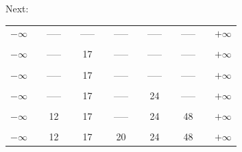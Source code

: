 \documentclass[english]{article}
\begin{document}
    Next:\\
\begin{tabular}{ccccccccccccc}
    $-\infty$ &  & ----- &  & ----- &  & ----- &  & ----- &  & ----- &  & $+\infty$\tabularnewline
              &  &       &  &       &  &       &  &       &  &       &  & \tabularnewline
    $-\infty$ &  & ----- &  & 17    &  & ----- &  & ----- &  & ----- &  & $+\infty$\tabularnewline
              &  &       &  &       &  &       &  &       &  &       &  & \tabularnewline
    $-\infty$ &  & ----- &  & 17    &  & ----- &  & ----- &  & ----- &  & $+\infty$\tabularnewline
              &  &       &  &       &  &       &  &       &  &       &  & \tabularnewline
    $-\infty$ &  & ----- &  & 17    &  & ----- &  & 24    &  & ----- &  & $+\infty$\tabularnewline
              &  &       &  &       &  &       &  &       &  &       &  & \tabularnewline
    $-\infty$ &  & 12    &  & 17    &  & ----- &  & 24    &  & 48    &  & $+\infty$\tabularnewline
              &  &       &  &       &  &       &  &       &  &       &  & \tabularnewline
    $-\infty$ &  & 12    &  & 17    &  & 20    &  & 24    &  & 48    &  & $+\infty$\tabularnewline
    \end{tabular} \bigskip\\    

\end{document}
